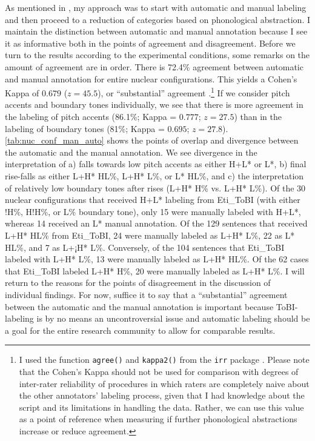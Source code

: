 As mentioned in , my approach was to start with automatic and manual labeling and then proceed to a reduction of categories based on phonological abstraction. I maintain the distinction between automatic and manual annotation because I see it as informative both in the points of agreement and disagreement. Before we turn to the results according to the experimental conditions, some remarks on the amount of agreement are in order. There is 72.4\% agreement between automatic and manual annotation for entire nuclear configurations. This yields a Cohen's Kappa of $0.679$ ($z = 45.5$), or ``substantial'' agreement \citep[165]{LandisKoch.1977}.\footnote{I used the function \texttt{agree()} and \texttt{kappa2()} from the \texttt{irr} package \citep{GamerLemonPuspendraSingh.2019}. Please note that the Cohen's Kappa should not be used for comparison with degrees of inter-rater reliability of procedures in which raters are completely naive about the other annotators' labeling process, given that I had knowledge about the script and its limitations in handling the data. Rather, we can use this value as a point of reference when measuring if further phonological abstractions increase or reduce agreement.} If we consider pitch accents and boundary tones individually, we see that there is more agreement in the labeling of pitch accents (86.1\%; Kappa = $0.777$; $z = 27.5$) than in the labeling of boundary tones (81\%; Kappa = $0.695$; $z = 27.8$). \autoref{tab:nuc_conf_man_auto} shows the points of overlap and divergence between the automatic and the manual annotation. We see divergence in the interpretation of a) falls towards low pitch accents as either H+L* or L*, b) final rise-falls as either L+H* HL\%, L+H* L\%, or L* HL\%, and c) the interpretation of relatively low boundary tones after rises (L+H* H\% vs. L+H* L\%). Of the 30 nuclear configurations that received H+L* labeling from Eti\_ToBI (with either !H\%, H!H\%, or L\% boundary tone), only 15 were manually labeled with H+L*, whereas 14 received an L* manual annotation. Of the 129 sentences that received L+H* HL\% from Eti\_ToBI, 24 were manually labeled as L+H* L\%, 22 as L* HL\%, and 7 as L+¡H* L\%. Conversely, of the 104 sentences that Eti\_ToBI labeled with L+H* L\%, 13 were manually labeled as L+H* HL\%. Of the 62 cases that Eti\_ToBI labeled L+H* H\%, 20 were manually labeled as L+H* L\%. I will return to the reasons for the points of disagreement in the discussion of individual findings. For now, suffice it to say that a ``substantial'' agreement between the automatic and the manual annotation is important because ToBI-labeling is by no means an uncontroversial issue and automatic labeling should be a goal for the entire research community to allow for comparable results.\largerpage

